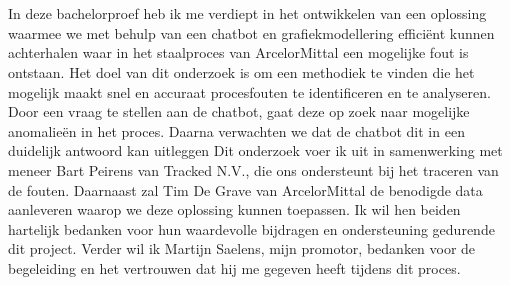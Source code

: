 
\chapter*{}%
\label{ch:voorwoord}

In deze bachelorproef heb ik me verdiept in het ontwikkelen van een oplossing waarmee we met behulp van een chatbot en grafiekmodellering efficiënt kunnen achterhalen waar in het staalproces van ArcelorMittal een mogelijke fout is ontstaan. 
Het doel van dit onderzoek is om een methodiek te vinden die het mogelijk maakt snel en accuraat procesfouten te identificeren en te analyseren.
Door een vraag te stellen aan de chatbot, gaat deze op zoek naar mogelijke anomalieën in het proces. Daarna verwachten we dat de chatbot dit in een duidelijk antwoord kan uitleggen
Dit onderzoek voer ik uit in samenwerking met meneer Bart Peirens van Tracked N.V., die ons ondersteunt bij het traceren van de fouten. Daarnaast zal Tim De Grave van ArcelorMittal de benodigde data aanleveren waarop we deze oplossing kunnen toepassen. 
Ik wil hen beiden hartelijk bedanken voor hun waardevolle bijdragen en ondersteuning gedurende dit project. Verder wil ik Martijn Saelens, mijn promotor, bedanken voor de begeleiding en het vertrouwen dat hij me gegeven heeft tijdens dit proces.

